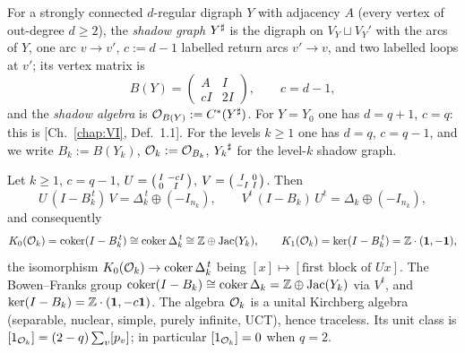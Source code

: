 \begin{definition}\label{VIII:def:shadow}
For a strongly connected $d$-regular digraph $Y$ with adjacency $A$ (every vertex of
out-degree $d\ge2$), the \emph{shadow graph} ${Y}^{\sharp}$ is the digraph on
$V_Y\sqcup V_Y'$ with the arcs of $Y$, one arc $v\to v'$, $c:=d-1$ labelled return arcs
$v'\to v$, and two labelled loops at $v'$; its vertex matrix is
\[
B(Y)=\begin{pmatrix}A&I\\ cI&2I\end{pmatrix},\qquad c=d-1 ,
\]
and the \emph{shadow algebra} is $\mathcal{O}_{B(Y)}:=C^*({Y}^{\sharp})$. For $Y=Y_0$ one has
$d=q{+}1$, $c=q$: this is [Ch.~\ref{chap:VI}, Def.~1.1]. For the levels $k\ge1$ one has $d=q$,
$c=q-1$, and we write $B_k:=B(Y_k)$, $\mathcal{O}_k:=\mathcal{O}_{B_k}$, ${Y_k}^{\sharp}$ for the
level-$k$ shadow graph.
\end{definition}

\begin{theorem}\label{VIII:thm:level}
Let $k\ge1$, $c=q-1$, $U=\begin{psmallmatrix}I&-cI\\0&I\end{psmallmatrix}$,
$V=\begin{psmallmatrix}I&0\\-I&I\end{psmallmatrix}$. Then
\begin{equation}\label{VIII:eq:factor}
U\,(I-B_k^{\,t})\,V=\Delta_k^{\,t}\oplus(-I_{n_k}),\qquad
V^{t}\,(I-B_k)\,U^{t}=\Delta_k\oplus(-I_{n_k}),
\end{equation}
and consequently
\[
K_0(\mathcal{O}_k)=\operatorname{coker}(I-B_k^{\,t})\cong\operatorname{coker}\Delta_k^{\,t}\cong\mathbb{Z}\oplus\operatorname{Jac}(Y_k),\qquad
K_1(\mathcal{O}_k)=\ker(I-B_k^{\,t})=\mathbb{Z}\cdot(\mathbf1,-\mathbf1),
\]
the isomorphism $K_0(\mathcal{O}_k)\to\operatorname{coker}\Delta_k^{\,t}$ being $[x]\mapsto[\text{first block
of }Ux]$. The Bowen--Franks group $\operatorname{coker}(I-B_k)\cong\operatorname{coker}\Delta_k=\mathbb{Z}\oplus\operatorname{Jac}(Y_k)$
via $V^t$, and $\ker(I-B_k)=\mathbb{Z}\cdot(\mathbf1,-c\mathbf1)$. The algebra $\mathcal{O}_k$ is a
unital Kirchberg algebra (separable, nuclear, simple, purely infinite, UCT), hence
traceless. Its unit class is $[1_{\mathcal{O}_k}]=(2-q)\sum_v[p_v]$; in particular
$[1_{\mathcal{O}_k}]=0$ when $q=2$.
\end{theorem}

